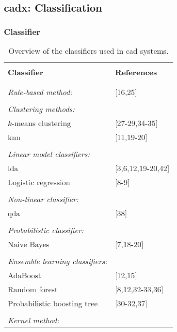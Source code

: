 \subsection{\ac{cadx}: Classification} \label{subsec:classification}

\subsubsection{Classifier}

\begin{table}
	\caption{Overview of the classifiers used in \ac{cad} systems.}
	\small
	\begin{tabular}{p{.60\linewidth} p{.30\linewidth}}
		\hline \\ [-1.5ex]
		\textbf{Classifier} & \textbf{References} \\ \\ [-1.5ex]
		\hline \\ [-1.5ex]
		\textit{Rule-based method:} & $[$16,25$]$ \\ \\ [-1.5ex]
		\textit{Clustering methods:} & \\
		\quad $k$-means clustering & $[$27-29,34-35$]$ \\
		\quad \acs{knn} & $[$11,19-20$]$ \\ \\ [-1.5ex]
		\textit{Linear model classifiers:} & \\
		\quad \acs{lda} & $[$3,6,12,19-20,42$]$ \\
		\quad Logistic regression & $[$8-9$]$ \\ \\ [-1.5ex]
		\textit{Non-linear classifier:} & \\
		\quad \acs{qda} & $[$38$]$ \\ \\ [-1.5ex]
		\textit{Probabilistic classifier:} & \\
		\quad Naive Bayes & $[$7,18-20$]$ \\ \\ [-1.5ex]
		\textit{Ensemble learning classifiers:} & \\
		\quad AdaBoost & $[$12,15$]$ \\
		\quad Random forest & $[$8,12,32-33,36$]$ \\
		\quad Probabilistic boosting tree & $[$30-32,37$]$ \\ \\ [-1.5ex]
		\textit{Kernel method:} & \\

\end{tabular}
\end{table}
